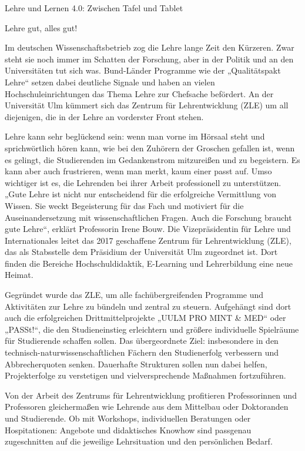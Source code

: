 Lehre und Lernen 4.0: Zwischen Tafel und Tablet

Lehre gut, alles gut!

Im deutschen Wissenschaftsbetrieb zog die Lehre lange Zeit den Kürzeren. Zwar steht sie noch immer im Schatten der Forschung, aber in der Politik und an den Universitäten tut sich was. Bund-Länder Programme wie der „Qualitätspakt Lehre“ setzen dabei deutliche Signale und haben an vielen Hochschuleinrichtungen das Thema Lehre zur Chefsache befördert. An der Universität Ulm kümmert sich das Zentrum für Lehrentwicklung (ZLE) um all diejenigen, die in der Lehre an vorderster Front stehen.

Lehre kann sehr beglückend sein: wenn man vorne im Hörsaal steht und sprichwörtlich hören kann, wie bei den Zuhörern der Groschen gefallen ist, wenn es gelingt, die Studierenden im Gedankenstrom mitzureißen und zu begeistern. Es kann aber auch frustrieren, wenn man merkt, kaum einer passt auf. Umso wichtiger ist es, die Lehrenden bei ihrer Arbeit professionell zu unterstützen. „Gute Lehre ist nicht nur entscheidend für die erfolgreiche Vermittlung von Wissen. Sie weckt Begeisterung für das Fach und motiviert für die Auseinandersetzung mit wissenschaftlichen Fragen. Auch die Forschung braucht gute Lehre“, erklärt Professorin Irene Bouw. Die Vizepräsidentin für Lehre und Internationales leitet das 2017 geschaffene Zentrum für Lehrentwicklung (ZLE), das als Stabsstelle dem Präsidium der Universität Ulm zugeordnet ist. Dort finden die Bereiche Hochschuldidaktik, E-Learning und Lehrerbildung eine neue Heimat.


Gegründet wurde das ZLE, um alle fachübergreifenden Programme und Aktivitäten zur Lehre zu bündeln und zentral zu steuern. Aufgehängt sind dort auch die erfolgreichen Drittmittelprojekte „UULM PRO MINT \& MED“ oder „PASSt!“, die den Studieneinstieg erleichtern und größere individuelle Spielräume für Studierende schaffen sollen. Das übergeordnete Ziel: insbesondere in den technisch-naturwissenschaftlichen Fächern den Studienerfolg verbessern und Abbrecherquoten senken. Dauerhafte Strukturen sollen nun dabei helfen, Projekterfolge zu verstetigen und vielversprechende Maßnahmen fortzuführen. 

Von der Arbeit des Zentrums für Lehrentwicklung profitieren Professorinnen und Professoren gleichermaßen wie Lehrende aus dem Mittelbau oder Doktoranden und Studierende. Ob mit Workshops, individuellen Beratungen oder Hospitationen: Angebote und didaktisches Knowhow sind passgenau zugeschnitten auf die jeweilige Lehrsituation und den persönlichen Bedarf. 

